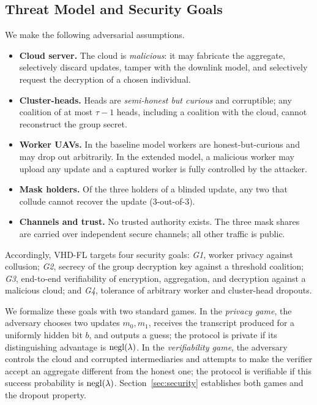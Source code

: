 \subsection{Threat Model and Security Goals}
\label{subsec:threat}
We make the following adversarial assumptions.
\begin{itemize}[leftmargin=*,topsep=2pt,itemsep=1pt]
  \item \textbf{Cloud server.} The cloud is \emph{malicious}: it may fabricate the aggregate, selectively discard updates, tamper with the downlink model, and selectively request the decryption of a chosen individual.
  \item \textbf{Cluster-heads.} Heads are \emph{semi-honest but curious} and corruptible; any coalition of at most $\tau-1$ heads, including a coalition with the cloud, cannot reconstruct the group secret.
  \item \textbf{Worker UAVs.} In the baseline model workers are honest-but-curious and may drop out arbitrarily. In the extended model, a malicious worker may upload any update and a captured worker is fully controlled by the attacker.
  \item \textbf{Mask holders.} Of the three holders of a blinded update, any two that collude cannot recover the update (3-out-of-3).
  \item \textbf{Channels and trust.} No trusted authority exists. The three mask shares are carried over independent secure channels; all other traffic is public.
\end{itemize}
Accordingly, \textsc{VHD-FL} targets four security goals: \emph{G1}, worker privacy against collusion; \emph{G2}, secrecy of the group decryption key against a threshold coalition; \emph{G3}, end-to-end verifiability of encryption, aggregation, and decryption against a malicious cloud; and \emph{G4}, tolerance of arbitrary worker and cluster-head dropouts.

We formalize these goals with two standard games. In the \emph{privacy game}, the adversary chooses two updates $m_0,m_1$, receives the transcript produced for a uniformly hidden bit $b$, and outputs a guess; the protocol is private if its distinguishing advantage is $\operatorname{negl}(\lambda)$. In the \emph{verifiability game}, the adversary controls the cloud and corrupted intermediaries and attempts to make the verifier accept an aggregate different from the honest one; the protocol is verifiable if this success probability is $\operatorname{negl}(\lambda)$. Section~\ref{sec:security} establishes both games and the dropout property.

